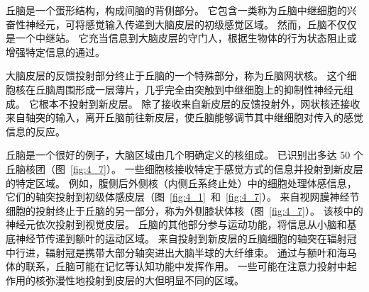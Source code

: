 丘脑是一个蛋形结构，构成间脑的背侧部分。 
它包含一类称为丘脑中继细胞的兴奋性神经元，可将感觉输入传递到大脑皮层的初级感觉区域。 
然而，丘脑不仅仅是一个中继站。 
它充当信息到大脑皮层的守门人，根据生物体的行为状态阻止或增强特定信息的通过。


大脑皮层的反馈投射部分终止于丘脑的一个特殊部分，称为丘脑网状核。 
这个细胞核在丘脑周围形成一层薄片，几乎完全由突触到中继细胞上的抑制性神经元组成。 
它根本不投射到新皮层。 
除了接收来自新皮层的反馈投射外，网状核还接收来自轴突的输入，离开丘脑前往新皮层，使丘脑能够调节其中继细胞对传入的感觉信息的反应。


丘脑是一个很好的例子，大脑区域由几个明确定义的核组成。
已识别出多达 50 个丘脑核团（图~\ref{fig:4_7}）。
一些细胞核接收特定于感觉方式的信息并投射到新皮层的特定区域。
例如，腹侧后外侧核（内侧丘系终止处）中的细胞处理体感信息，它们的轴突投射到初级体感皮层（图~\ref{fig:4_1}~和~\ref{fig:4_7}）。 
来自视网膜神经节细胞的投射终止于丘脑的另一部分，称为外侧膝状体核（图~\ref{fig:4_7}）。 
该核中的神经元依次投射到视觉皮层。 
丘脑的其他部分参与运动功能，将信息从小脑和基底神经节传递到额叶的运动区域。 
来自投射到新皮层的丘脑细胞的轴突在辐射冠中行进，辐射冠是携带大部分轴突进出大脑半球的大纤维束。 
通过与额叶和海马体的联系，丘脑可能在记忆等认知功能中发挥作用。 
一些可能在注意力投射中起作用的核弥漫性地投射到皮层的大但明显不同的区域。


